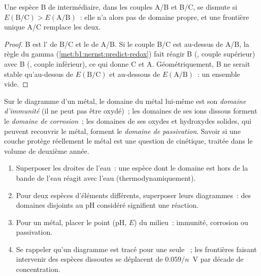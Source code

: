 \begin{proposition}\label{prop:b1:e-ph-diagrams:disproportionation-criterion}
Une espèce B de  intermédiaire, dans les couples A/B et
B/C, se dismute si $E(\mathrm{B}/\mathrm{C}) > E(\mathrm{A}/\mathrm{B})$~:
elle n'a alors pas de domaine propre, et une frontière unique A/C
remplace les deux.
\end{proposition}

\begin{proof}
B est l' de B/C et le  de A/B. Si le couple B/C est
au-dessus de A/B, la règle du gamma (\cref{met:b1:nernst:predict-redox})
fait réagir B (, couple supérieur) avec B (, couple
inférieur), ce qui donne C et A. Géométriquement, B ne serait stable
qu'au-dessus de $E(\mathrm{B}/\mathrm{C})$
et au-dessous de $E(\mathrm{A}/\mathrm{B})$~: un ensemble vide.
\end{proof}

\begin{definition}\label{def:b1:e-ph-diagrams:corrosion-domains}
Sur le diagramme d'un métal, le domaine du métal lui-même est son
\emph{domaine d'immunité} (il ne peut pas être oxydé)~;
les domaines de ses ions dissous forment le \emph{domaine de
corrosion}~; les domaines de ses oxydes et
hydroxydes solides, qui peuvent recouvrir le métal, forment le
\emph{domaine de passivation}. Savoir si
une couche protège réellement le métal est une question de cinétique,
traitée dans le volume de deuxième année.
\end{definition}

\begin{method}\label{met:b1:e-ph-diagrams:read}
\begin{enumerate}
  \item Superposer les droites de l'eau~: une espèce dont le domaine est
        hors de la bande de l'eau réagit avec l'eau
        (thermodynamiquement).
  \item Pour deux espèces d'éléments différents, superposer leurs
        diagrammes~: des domaines disjoints au pH considéré signifient
        une réaction.
  \item Pour un métal, placer le point (pH, $E$) du milieu~: immunité,
        corrosion ou passivation.
  \item Se rappeler qu'un diagramme est tracé pour une seule
        ~; les frontières faisant intervenir des
        espèces dissoutes se déplacent de $0.059/n$~V par décade de
        concentration.
\end{enumerate}
\end{method}

